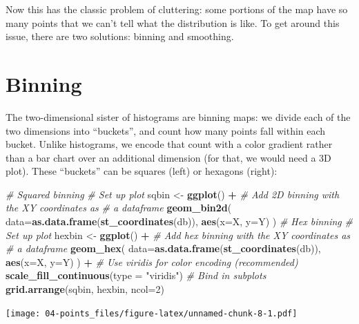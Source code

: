 \documentclass[
]{book}
\newenvironment{Shaded}{\begin{snugshade}}{\end{snugshade}}
\newcommand{\CommentTok}[1]{\textcolor[rgb]{0.56,0.35,0.01}{\textit{#1}}}
\newcommand{\DataTypeTok}[1]{\textcolor[rgb]{0.13,0.29,0.53}{#1}}
\newcommand{\DecValTok}[1]{\textcolor[rgb]{0.00,0.00,0.81}{#1}}
\newcommand{\KeywordTok}[1]{\textcolor[rgb]{0.13,0.29,0.53}{\textbf{#1}}}
\newcommand{\NormalTok}[1]{#1}
\newcommand{\OperatorTok}[1]{\textcolor[rgb]{0.81,0.36,0.00}{\textbf{#1}}}
\newcommand{\StringTok}[1]{\textcolor[rgb]{0.31,0.60,0.02}{#1}}
\begin{document}
Now this has the classic problem of cluttering: some portions of the map have so many points that we can't tell what the distribution is like. To get around this issue, there are two solutions: binning and smoothing.

\hypertarget{binning}{%
\section{Binning}\label{binning}}

The two-dimensional sister of histograms are binning maps: we divide each of the two dimensions into ``buckets'', and count how many points fall within each bucket. Unlike histograms, we encode that count with a color gradient rather than a bar chart over an additional dimension (for that, we would need a 3D plot). These ``buckets'' can be squares (left) or hexagons (right):

\begin{Shaded}
\begin{Highlighting}[]
      \CommentTok{# Squared binning}
\CommentTok{# Set up plot}
\NormalTok{sqbin <-}\StringTok{ }\KeywordTok{ggplot}\NormalTok{() }\OperatorTok{+}\StringTok{ }
\CommentTok{# Add 2D binning with the XY coordinates as}
\CommentTok{# a dataframe}
\StringTok{  }\KeywordTok{geom_bin2d}\NormalTok{(}
    \DataTypeTok{data=}\KeywordTok{as.data.frame}\NormalTok{(}\KeywordTok{st_coordinates}\NormalTok{(db)), }
    \KeywordTok{aes}\NormalTok{(}\DataTypeTok{x=}\NormalTok{X, }\DataTypeTok{y=}\NormalTok{Y)}
\NormalTok{  )}
      \CommentTok{# Hex binning}
\CommentTok{# Set up plot}
\NormalTok{hexbin <-}\StringTok{ }\KeywordTok{ggplot}\NormalTok{() }\OperatorTok{+}
\CommentTok{# Add hex binning with the XY coordinates as}
\CommentTok{# a dataframe }
\StringTok{  }\KeywordTok{geom_hex}\NormalTok{(}
    \DataTypeTok{data=}\KeywordTok{as.data.frame}\NormalTok{(}\KeywordTok{st_coordinates}\NormalTok{(db)),}
    \KeywordTok{aes}\NormalTok{(}\DataTypeTok{x=}\NormalTok{X, }\DataTypeTok{y=}\NormalTok{Y)}
\NormalTok{  ) }\OperatorTok{+}
\CommentTok{# Use viridis for color encoding (recommended)}
\StringTok{  }\KeywordTok{scale_fill_continuous}\NormalTok{(}\DataTypeTok{type =} \StringTok{"viridis"}\NormalTok{)}
      \CommentTok{# Bind in subplots}
\KeywordTok{grid.arrange}\NormalTok{(sqbin, hexbin, }\DataTypeTok{ncol=}\DecValTok{2}\NormalTok{)}
\end{Highlighting}
\end{Shaded}

\texttt{[image: 04-points\_files/figure-latex/unnamed-chunk-8-1.pdf]}
\end{document}
